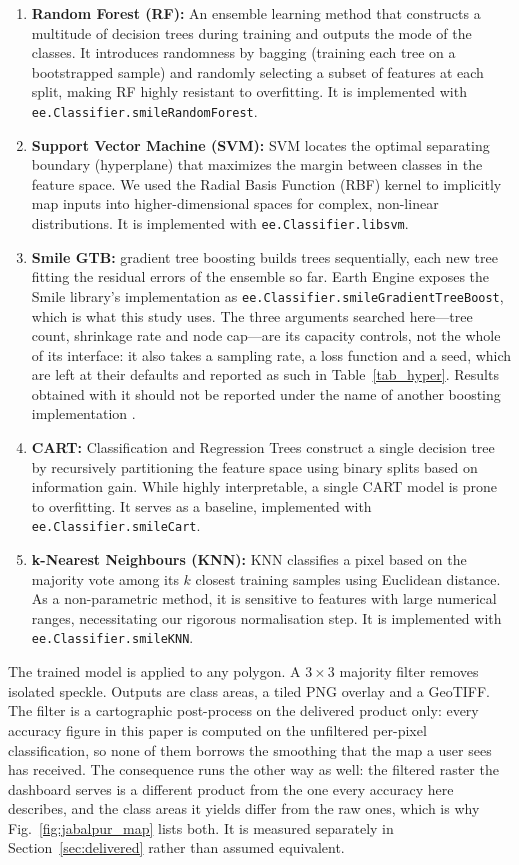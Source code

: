 \documentclass[conference]{IEEEtran}
\begin{document}
\begin{enumerate}
    \item \textbf{Random Forest (RF):} An ensemble learning method \cite{r11} that constructs a multitude of decision trees during training and outputs the mode of the classes. It introduces randomness by bagging (training each tree on a bootstrapped sample) and randomly selecting a subset of features at each split, making RF highly resistant to overfitting. It is implemented with \texttt{ee.Classifier.smileRandomForest}.
    \item \textbf{Support Vector Machine (SVM):} SVM \cite{r12} locates the optimal separating boundary (hyperplane) that maximizes the margin between classes in the feature space. We used the Radial Basis Function (RBF) kernel to implicitly map inputs into higher-dimensional spaces for complex, non-linear distributions. It is implemented with \texttt{ee.Classifier.libsvm}.
    \item \textbf{Smile GTB:} gradient tree boosting \cite{r27} builds trees sequentially, each new tree fitting the residual errors of the ensemble so far. Earth Engine exposes the Smile library's implementation as \texttt{ee.Classifier.smileGradientTreeBoost}, which is what this study uses. The three arguments searched here---tree count, shrinkage rate and node cap---are its capacity controls, not the whole of its interface: it also takes a sampling rate, a loss function and a seed, which are left at their defaults and reported as such in Table~\ref{tab_hyper}. Results obtained with it should not be reported under the name of another boosting implementation \cite{r13}.
    \item \textbf{CART:} Classification and Regression Trees construct a single decision tree by recursively partitioning the feature space using binary splits based on information gain. While highly interpretable, a single CART model is prone to overfitting. It serves as a baseline, implemented with \texttt{ee.Classifier.smileCart}.
    \item \textbf{k-Nearest Neighbours (KNN):} KNN classifies a pixel based on the majority vote among its $k$ closest training samples using Euclidean distance. As a non-parametric method, it is sensitive to features with large numerical ranges, necessitating our rigorous normalisation step. It is implemented with \texttt{ee.Classifier.smileKNN}.
\end{enumerate}
The trained model is applied to any polygon. A $3\times3$ majority filter removes isolated speckle. Outputs are class areas, a tiled PNG overlay and a GeoTIFF. The filter is a cartographic post-process on the delivered product only: every accuracy figure in this paper is computed on the unfiltered per-pixel classification, so none of them borrows the smoothing that the map a user sees has received. The consequence runs the other way as well: the filtered raster the dashboard serves is a different product from the one every accuracy here describes, and the class areas it yields differ from the raw ones, which is why Fig.~\ref{fig:jabalpur_map} lists both. It is measured separately in Section~\ref{sec:delivered} rather than assumed equivalent.
\end{document}
